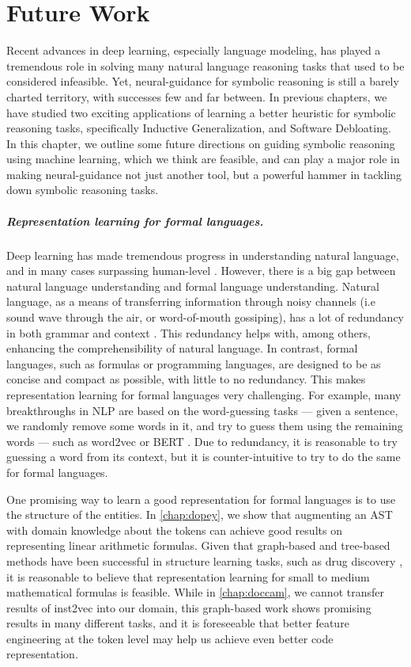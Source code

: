 \chapter{Future Work}
\label{chap:future}
Recent advances in deep learning, especially language modeling, has played a tremendous role in solving many natural language reasoning tasks that used to be considered infeasible. Yet, neural-guidance for symbolic reasoning is still a barely charted territory, with successes few and far between.
In previous chapters, we have studied two exciting applications of learning a better heuristic for symbolic reasoning tasks, specifically Inductive Generalization, and Software Debloating.
In this chapter, we outline some future directions on guiding symbolic reasoning using machine learning, which we think are feasible, and can play a major role in making neural-guidance not just another tool, but a powerful hammer in tackling down symbolic reasoning tasks.

\paragraph{Representation learning for formal languages.} Deep learning has made
tremendous progress in understanding natural language, and in many cases
surpassing human-level \cite{glue-bench}.
However, there is a big gap between natural language understanding and formal
language understanding. Natural language, as a means of transferring information
through noisy channels (i.e sound wave through the air, or word-of-mouth
gossiping), has a lot of redundancy in both grammar and context
\cite{ling_redundancy}.
This redundancy helps with, among others, enhancing the comprehensibility of
natural language.
In contrast, formal languages, such as formulas or programming languages, are
designed to be as concise and compact as possible, with little to no redundancy.
This makes representation learning for formal languages very challenging.
For example, many breakthroughs in NLP are based on the word-guessing tasks --- given a sentence, we randomly remove some words in it, and try to guess them using the remaining words --- such as word2vec \cite{word2vec} or BERT \cite{bert}. Due to redundancy, it is reasonable to try guessing a word from its context, but it is counter-intuitive to try to do the same for formal languages. 

One promising way to learn a good representation for formal languages is to use the structure of the entities. In \cref{chap:dopey}, we show that augmenting an AST with domain knowledge about the tokens can achieve good results on representing linear arithmetic formulas. Given that graph-based and tree-based methods have been successful in structure learning tasks, such as drug discovery \cite{drug_dis}, it is reasonable to believe that representation learning for small to medium mathematical formulas is feasible. While in \cref{chap:doccam}, we cannot transfer results of inst2vec \cite{inst2vec} into our domain, this graph-based work shows promising results in many different tasks, and it is foreseeable that better feature engineering at the token level may help us achieve even better code representation.

